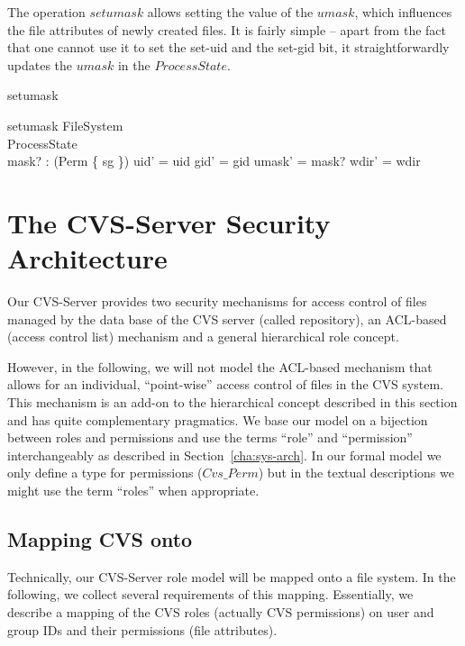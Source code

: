 The operation $setumask$ allows setting the value of the $umask$, which
influences the file attributes of newly created files. It is fairly simple --
apart from the fact that one cannot use it to set the set-uid and the set-gid
bit, it straightforwardly updates the $umask$ in the $ProcessState$.
\begin{doc}{setumask}
  \begin{schema}{setumask} 
    \Xi FileSystem \\
    \Delta ProcessState \\
    mask? : \power (Perm \setminus \{ sg \}) 
    \where
    uid' = uid \land gid' = gid \land umask' = mask? \land wdir' = wdir
  \end{schema}
\end{doc}


\section[CVS-Server]{The CVS-Server Security Architecture}

\vspace{1ex}\noindent

Our CVS-Server provides two security mechanisms for access control of files
managed by the data base of the CVS server (called repository), an ACL-based
(access control list) mechanism and a general hierarchical role concept.

However, in the following, we will not model the ACL-based mechanism that allows
for an individual, ``point-wise'' access control of files in the CVS system.
This mechanism is an add-on to the hierarchical concept described in this
section and has quite complementary pragmatics.  We base our model on a
bijection between roles and permissions and use the terms ``role'' and
``permission'' interchangeably as described in Section~\ref{cha:sys-arch}.  In
our formal model we only define a type for permissions ($Cvs\_Perm$) but in the
textual descriptions we might use the term ``roles'' when appropriate.


\subsection{Mapping CVS onto \unix}

Technically, our CVS-Server role model will be mapped onto a \unix{} file
system. In the following, we collect several requirements of this mapping.
Essentially, we describe a mapping of the CVS roles (actually CVS permissions)
on \unix{} user and group IDs and their permissions (file attributes).

